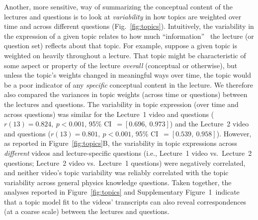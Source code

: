 \documentclass[10pt]{article}
\newcommand{\topicWeights}{1}
\begin{document}
Another, more sensitive, way of summarizing the conceptual content of the
lectures and questions is to look at \textit{variability} in how topics are
weighted over time and across different questions (Fig.~\ref{fig:topics}).
Intuitively, the variability in the expression of a given topic relates to how
much ``information''~\citep{Fish22} the lecture (or question set) reflects about
that topic. For example, suppose a given topic is weighted on heavily
throughout a lecture. That topic might be characteristic of some aspect or
property of the lecture \textit{overall} (conceptual or otherwise), but unless
the topic's weights changed in meaningful ways over time, the topic would be a
poor indicator of any \textit{specific} conceptual content in the lecture. We
therefore also compared the variances in topic weights (across time or
questions) between the lectures and questions. The variability in topic
expression (over time and across questions) was similar for the Lecture~1 video
and questions ($r(13) = 0.824,~p<0.001$, 95\% CI~$= [0.696,~0.973]$) and the Lecture~2
video and questions ($r(13) = 0.801,~p<0.001$, 95\% CI~$= [0.539,~0.958]$). 
However, as reported in Figure~\ref{fig:topics}B, the variability in
topic expressions across \textit{different} videos and lecture-specific
questions (i.e., Lecture~1 video vs.~Lecture~2 questions; Lecture~2 video
vs.~Lecture~1 questions) were negatively correlated, and neither
video's topic variability was reliably correlated with the topic variability
across general physics knowledge questions. Taken together, the analyses
reported in Figure~\ref{fig:topics} and Supplementary Figure~\topicWeights~indicate that a topic
model fit to the videos' transcripts can also reveal correspondences (at a
coarse scale) between the lectures and questions.
\end{document}
